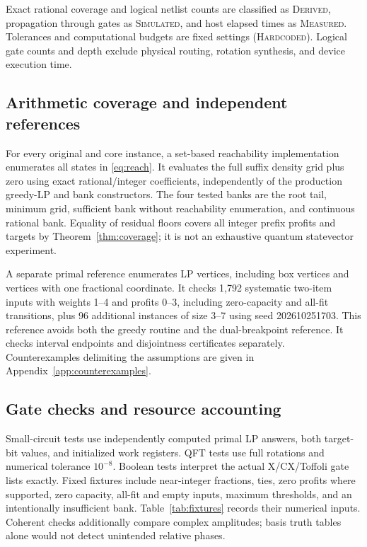 \documentclass[referee,pdflatex,sn-mathphys-num]{sn-jnl}
\theoremstyle{thmstyleone}
\theoremstyle{thmstyletwo}
\begin{document}
Exact rational coverage and logical netlist counts are classified as \textsc{Derived}, propagation through gates as \textsc{Simulated}, and host elapsed times as \textsc{Measured}. Tolerances and computational budgets are fixed settings (\textsc{Hardcoded}). Logical gate counts and depth exclude physical routing, rotation synthesis, and device execution time.

\subsection{Arithmetic coverage and independent references}
For every original and core instance, a set-based reachability implementation enumerates all states in \eqref{eq:reach}. It evaluates the full suffix density grid plus zero using exact rational/integer coefficients, independently of the production greedy-LP and bank constructors. The four tested banks are the root tail, minimum grid, sufficient bank without reachability enumeration, and continuous rational bank. Equality of residual floors covers all integer prefix profits and targets by Theorem~\ref{thm:coverage}; it is not an exhaustive quantum statevector experiment.

A separate primal reference enumerates LP vertices, including box vertices and vertices with one fractional coordinate. It checks 1,792 systematic two-item inputs with weights 1--4 and profits 0--3, including zero-capacity and all-fit transitions, plus 96 additional instances of size 3--7 using seed 202610251703. This reference avoids both the greedy routine and the dual-breakpoint reference. It checks interval endpoints and disjointness certificates separately. Counterexamples delimiting the assumptions are given in Appendix~\ref{app:counterexamples}.

\subsection{Gate checks and resource accounting}
Small-circuit tests use independently computed primal LP answers, both target-bit values, and initialized work registers. QFT tests use full rotations and numerical tolerance $10^{-8}$. Boolean tests interpret the actual X/CX/Toffoli gate lists exactly. Fixed fixtures include near-integer fractions, ties, zero profits where supported, zero capacity, all-fit and empty inputs, maximum thresholds, and an intentionally insufficient bank. Table~\ref{tab:fixtures} records their numerical inputs. Coherent checks additionally compare complex amplitudes; basis truth tables alone would not detect unintended relative phases.
\end{document}
